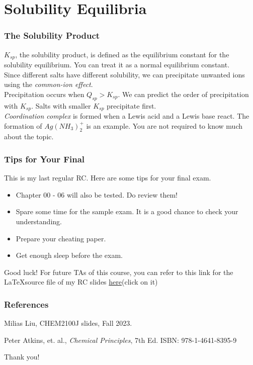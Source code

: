 \documentclass[aspectratio=169]{beamer}
\def\blankline{\\[12pt]}
\begin{document}
\section{Solubility Equilibria}
\begin{frame}
  \frametitle{The Solubility Product}
  $K_{sp}$, the solubility product, is defined as the equilibrium constant for the solubility equilibrium. You can treat it 
  as a normal equilibrium constant.
  \blankline
  Since different salts have different solubility, we can precipitate unwanted ions using the \textit{common-ion effect}.
  \blankline
  Precipitation occurs when $Q_{sp} > K_{sp}$. We can predict the order of precipitation with $K_{sp}$. Salts with smaller $K_{sp}$
  precipitate first.
  \blankline
  \textit{Coordination complex} is formed when a Lewis acid and a Lewis base react. The formation of $Ag(NH_3)_2^+$ is an example. 
  You are not required to know much about the topic.
\end{frame}
\begin{frame}
  \frametitle{Tips for Your Final}
  This is my last regular RC. Here are some tips for your final exam.
  \begin{itemize}
    \item Chapter 00 - 06 will also be tested. Do review them!
    \item Spare some time for the sample exam. It is a good chance to check your understanding.
    \item Prepare your cheating paper.
    \item Get enough sleep before the exam.
  \end{itemize}
  Good luck! For future TAs of this course, you can refer to this link for the \LaTeX source file of my RC slides
  \href{https://github.com/JeffSnn/CHEM2100J-RC-Slides}{here}(click on it) 
\end{frame}
\begin{frame}
  \frametitle{References}
  
  \begin{thebibliography}{99} %
  Milias Liu, CHEM2100J slides, Fall 2023.
    
  Peter Atkins, et. al., \textit{Chemical Principles}, 7th Ed. ISBN: 978-1-4641-8395-9
    
  \end{thebibliography}
\end{frame}

\begin{frame}
  \Huge{\centerline{Thank you!}}
\end{frame}
\end{document}
